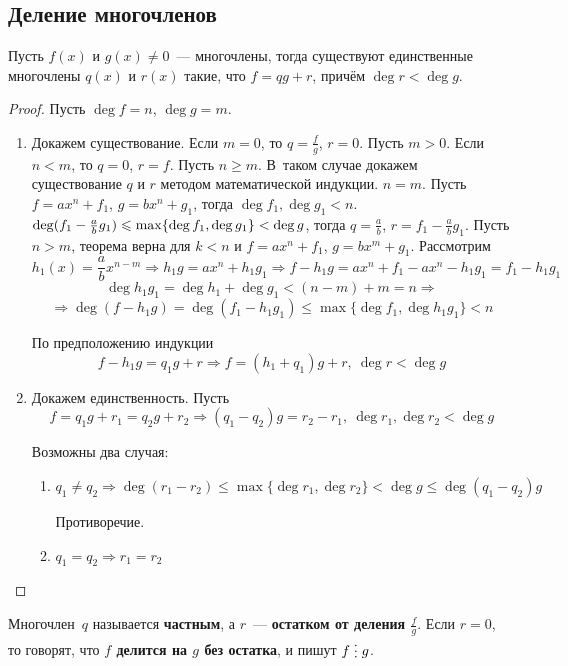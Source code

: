 \subsection{Деление многочленов}
\begin{theorem}
Пусть $f(x)$ и $g(x) \neq 0$~--- многочлены, тогда существуют единственные многочлены $q(x)$ и $r(x)$ такие, что $f = qg + r$, причём $\deg r < \deg g$.
\end{theorem}
\begin{proof}
Пусть $\deg f = n$, $\deg g = m$.
\begin{enumerate}
	\item Докажем существование.
	Если $m = 0$, то $q = \frac{f}g$, $r = 0$.
	Пусть $m > 0$.
	Если $n < m$, то $q = 0$, $r = f$.
	Пусть $n \geqslant m$.
	В~таком случае докажем существование $q$ и $r$ методом математической индукции.
		\indbase $n = m$.
		Пусть $f = a x^n + f_1$, $g = b x^n + g_1$, тогда $\deg f_1, \deg g_1 < n$.
		$\deg (f_1 - \frac{a}b g_1) \opbr\leqslant \max \{ \deg f_1, \deg g_1 \} \opbr< \deg g$, тогда $q = \frac{a}b$, $r = f_1 - \frac{a}b g_1$.
		\indstep Пусть $n > m$, теорема верна для $k < n$ и $f = a x^n + f_1$, $g = b x^m + g_1$.
		Рассмотрим
		\begin{equation*}
		h_1(x) = \frac{a}b x^{n-m} \Rightarrow
		h_1 g = a x^n + h_1 g_1 \Rightarrow
		f - h_1 g = a x^n + f_1 - a x^n - h_1 g_1 = f_1 - h_1 g_1
		\end{equation*}
		\begin{equation*}
		\deg h_1 g_1 = \deg h_1 + \deg g_1 < (n - m) + m = n \Rightarrow
		\end{equation*}
		\begin{equation*}
		\Rightarrow \deg (f - h_1 g) = \deg (f_1 - h_1 g_1) \leqslant \max \{ \deg f_1, \deg h_1 g_1 \} < n
		\end{equation*}
		
		По предположению индукции
		\begin{equation*}
		f - h_1 g = q_1 g + r \Rightarrow
		f = (h_1 + q_1)g + r, \ \deg r < \deg g
		\end{equation*}
		\indend
		
	\item Докажем единственность.
	Пусть
	\begin{equation*}
	f = q_1 g + r_1 = q_2 g + r_2 \Rightarrow
	(q_1 - q_2)g = r_2 - r_1, \ \deg r_1, \deg r_2 < \deg g
	\end{equation*}
	
	Возможны два случая:
	\begin{enumerate}
		\item $q_1 \neq q_2 \Rightarrow
		\deg (r_1 - r_2) \leqslant \max \{ \deg r_1, \deg r_2 \} < \deg g \leqslant \deg (q_1 - q_2)g$
		
		Противоречие.
		
		\item $q_1 = q_2 \Rightarrow r_1 = r_2$
	\end{enumerate}
\end{enumerate}
\end{proof}

Многочлен~$q$ называется \textbf{частным}, а $r$~--- \textbf{остатком от деления $\frac{f}g$}.
Если $r = 0$, то говорят, что \textbf{$f$ делится на $g$ без остатка}, и пишут $f \mult g$.